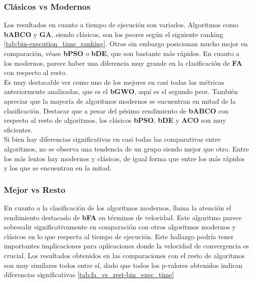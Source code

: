 \subsubsection{Clásicos vs Modernos}
Los resultados en cuanto a tiempo de ejecución son variados. Algoritmos como \textbf{bABCO} y \textbf{GA}, siendo clásicos, son los peores según el siguiente ranking \ref{tab:bin-execution_time_ranking}. Otros sin embargo posicionan mucho mejor en comparación, véase \textbf{bPSO} o \textbf{bDE}, que son bastante más rápidos. En cuanto a los modernos, parece haber una diferencia muy grande en la clasificación de \textbf{FA} con respecto al resto.\\[6pt]
Es muy destacable ver como uno de los mejores en casi todas las métricas anteriormente analizadas, que es el \textbf{bGWO}, aquí es el segundo peor. También apreciar que la mayoría de algoritmos modernos se encuentran en mitad de la clasificación. Destacar que a pesar del pésimo rendimiento de \textbf{bABCO} con respecto al resto de algoritmos, los clásicos \textbf{bPSO}, \textbf{bDE} y \textbf{ACO} son muy eficientes.\\[6pt]
Si bien hay diferencias significativas en casi todas las comparativas entre algoritmos, no se observa una tendencia de un grupo siendo mejor que otro. Entre los más lentos hay modernos y clásicos, de igual forma que entre los más rápidos y los que se encuentran en la mitad.

\subsubsection{Mejor vs Resto}
En cuanto a la clasificación de los algoritmos modernos, llama la atención el rendimiento destacado de \textbf{bFA} en términos de velocidad. Este algoritmo parece sobresalir significativamente en comparación con otros algoritmos modernos y clásicos en lo que respecta al tiempo de ejecución. Este hallazgo podría tener importantes implicaciones para aplicaciones donde la velocidad de convergencia es crucial. Los resultados obtenidos en las comparaciones con el resto de algoritmos son muy similares todos entre sí, dado que todos los p-valores obtenidos indican diferencias significativas \ref{tab:fa_vs_rest-bin_exec_time}

